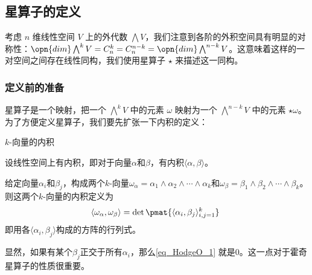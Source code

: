 


\subsection{星算子的定义}

考虑 $n$ 维线性空间 $V$ 上的外代数 $\bigwedge V$，我们注意到各阶的外积空间具有明显的对称性：$\opn{dim}\bigwedge^k V=C^k_n=C^{n-k}_n=\opn{dim}\bigwedge^{n-k} V$。这意味着这样的一对空间之间存在线性同构，我们使用星算子 $\star$ 来描述这一同构。


\subsubsection{定义前的准备}


星算子是一个映射，把一个 $\bigwedge^k V$ 中的元素 $\omega$ 映射为一个 $\bigwedge^{n-k} V$ 中的元素 $\star\omega$。为了方便定义星算子，我们要先扩张一下内积的定义：


\begin{definition}{$k$-向量的内积}\label{def_HodgeO_1}

设线性空间上有内积，即对于向量$\alpha$和$\beta$，有内积$\langle \alpha, \beta \rangle$。

给定向量$\alpha_i$和$\beta_j$，构成两个$k$-向量$\omega_\alpha=\alpha_1\wedge \alpha_2\wedge \cdots\wedge \alpha_k$和$\omega_\beta=\beta_1\wedge \beta_2\wedge \cdots\wedge \beta_k$。则这两个$k$-向量的内积定义为
\begin{equation}\label{eq_HodgeO_1}
\langle\omega_\alpha, \omega_\beta\rangle = \det \pmat{\langle \alpha_i, \beta_j \rangle_{i, j=1}^k}~
\end{equation}
即用各$\langle \alpha_i, \beta_j \rangle$构成的方阵的行列式。

\end{definition}

显然，如果有某个$\beta_j$正交于所有$\alpha_i$，那么\autoref{eq_HodgeO_1} 就是$0$。这一点对于霍奇星算子的性质很重要。







